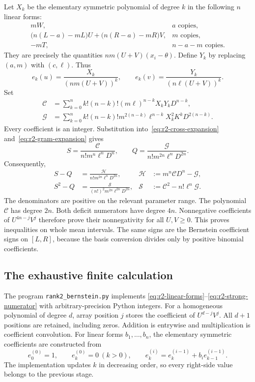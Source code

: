 \documentclass[11pt,a4paper]{article}
\theoremstyle{definition}
\theoremstyle{remark}
\begin{document}
Let $X_k$ be the elementary symmetric polynomial of degree $k$ in the following $n$ linear forms:
\begin{equation}\label{eq:r2-linear-forms}
\begin{array}{ll}
mW,&a\text{ copies},\\
\bigl(n(L-a)-mL\bigr)U+\bigl(n(R-a)-mR\bigr)V,
   &m\text{ copies},\\
-mT,&n-a-m\text{ copies}.
\end{array}
\end{equation}
They are precisely the quantities $nm(U+V)(x_i-\theta)$.
Define $Y_k$ by replacing $(a,m)$ with $(c,\ell)$.
Thus
\[
e_k(u)=\frac{X_k}{(nm(U+V))^k},\qquad
e_k(v)=\frac{Y_k}{(n\ell(U+V))^k}.
\]
Set
\begin{align}
\mathcal C
 &=\sum_{k=0}^n k!(n-k)!(m\ell)^{n-k}X_kY_kD^{n-k},
 \label{eq:r2-C}\\
\mathcal G
 &=\sum_{k=0}^n k!(n-k)!m^{2(n-k)}\ell^{n-k}
      X_k^2K^kD^{2(n-k)}.
 \label{eq:r2-G}
\end{align}
Every coefficient is an integer.
Substitution into~\eqref{eq:r2-cross-expansion} and~\eqref{eq:r2-gram-expansion} gives
\begin{equation}\label{eq:r2-denominators}
S=\frac{\mathcal C}{n!m^n\ell^nD^n},\qquad
Q=\frac{\mathcal G}{n!m^{2n}\ell^nD^{2n}}.
\end{equation}
Consequently,
\begin{align}
S-Q&=\frac{\mathcal H}{n!m^{2n}\ell^nD^{2n}},
&\mathcal H&:=m^n\mathcal C D^n-\mathcal G,
\label{eq:r2-H}\\
S^2-Q&=\frac{\mathcal S}{(n!)^2m^{2n}\ell^{2n}D^{2n}},
&\mathcal S&:=\mathcal C^2-n!\ell^n\mathcal G.
\label{eq:r2-strong-numerator}
\end{align}
The denominators are positive on the relevant parameter range.
The polynomial $\mathcal C$ has degree $2n$.
Both deficit numerators have degree $4n$.
Nonnegative coefficients of $U^{4n-j}V^j$ therefore prove their nonnegativity for all $U,V\ge0$.
This proves inequalities on whole mean intervals.
The same signs are the Bernstein coefficient signs on $[L,R]$, because the basis conversion divides only by positive binomial coefficients.

\subsection{The exhaustive finite calculation}

The program \nolinkurl{rank2_bernstein.py} implements
\eqref{eq:r2-linear-forms}--\eqref{eq:r2-strong-numerator} with arbitrary-precision Python integers.
For a homogeneous polynomial of degree $d$, array position $j$ stores the coefficient of $U^{d-j}V^j$.
All $d+1$ positions are retained, including zeros.
Addition is entrywise and multiplication is coefficient convolution.
For linear forms $b_1,\ldots,b_n$, the elementary symmetric coefficients are constructed from
\[
e_0^{(0)}=1,\qquad e_k^{(0)}=0\ (k>0),\qquad
e_k^{(i)}=e_k^{(i-1)}+b_i e_{k-1}^{(i-1)}.
\]
The implementation updates $k$ in decreasing order, so every right-side value belongs to the previous stage.
\end{document}
